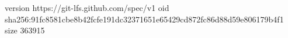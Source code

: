 version https://git-lfs.github.com/spec/v1
oid sha256:91fc8581cbe8b42fcfe191dc32371651e65429cd872fc86d88d59e806179b4f1
size 363915
